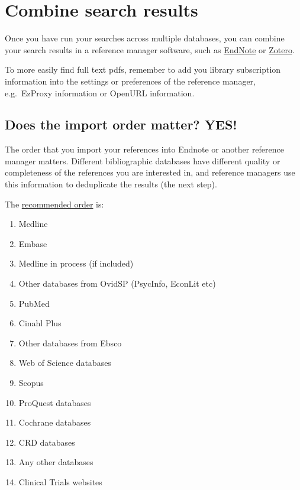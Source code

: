 \documentclass[
]{book}
\providecommand{\tightlist}{%
  \setlength{\itemsep}{0pt}\setlength{\parskip}{0pt}}
\begin{document}
\hypertarget{combine-search-results}{%
\section{Combine search results}\label{combine-search-results}}

Once you have run your searches across multiple databases, you can combine your search results in a reference manager software, such as \href{https://endnote.com/}{EndNote} or \href{https://www.zotero.org/}{Zotero}.

To more easily find full text pdfs, remember to add you library subscription information into the settings or preferences of the reference manager, e.g.~EzProxy information or OpenURL information.

\hypertarget{does-the-import-order-matter-yes}{%
\subsection{Does the import order matter? YES!}\label{does-the-import-order-matter-yes}}

The order that you import your references into Endnote or another reference manager matters. Different bibliographic databases have different quality or completeness of the references you are interested in, and reference managers use this information to deduplicate the results (the next step).

The \href{https://blogs.lshtm.ac.uk/library/2018/12/07/removing-duplicates-from-an-endnote-library/}{recommended order} is:

\begin{enumerate}
\def\labelenumi{\arabic{enumi}.}
\tightlist
\item
  Medline
\item
  Embase
\item
  Medline in process (if included)
\item
  Other databases from OvidSP (PsycInfo, EconLit etc)
\item
  PubMed
\item
  Cinahl Plus
\item
  Other databases from Ebsco
\item
  Web of Science databases
\item
  Scopus
\item
  ProQuest databases
\item
  Cochrane databases
\item
  CRD databases
\item
  Any other databases
\item
  Clinical Trials websites
\end{enumerate}
\end{document}
